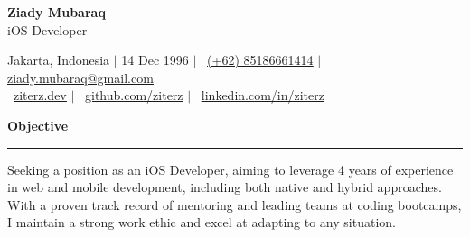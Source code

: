 \documentclass{article}
\newcommand{\header}[1]{
	\vspace{4mm}
	{\large \noindent \textbf{#1}}
	\vspace{1mm}
	\hrule
	\vspace{1mm}
}
\begin{document}
	\begin{flushleft}
		{\LARGE \textbf{Ziady Mubaraq}} \\
		{\large iOS Developer}

		\vspace{1mm}
		
		Jakarta, Indonesia  $\mid$ 14 Dec 1996 $\mid$ \faWhatsapp ~\href{https://wa.me/6285186661414}{\underline{(+62) 85186661414}} $\mid$ \faEnvelope[regular] \href{mailto:ziady.mubaraq@gmail.com}{\underline{ziady.mubaraq@gmail.com}} \\
		\faLink ~\href{https://ziterz.dev}{\underline{ziterz.dev}}  $\mid$ \faGithub ~\href{https://github.com/ziterz}{\underline{github.com/ziterz}} $\mid$ \faLinkedin ~\href{https://linkedin.com/in/ziterz}{\underline{linkedin.com/in/ziterz}}
	\end{flushleft}

	\vspace{-4mm}

	\header{Objective}
		\vspace{1mm}
		Seeking a position as an iOS Developer, aiming to leverage 4 years of experience in web and mobile development, including both native and hybrid approaches. With a proven track record of mentoring and leading teams at coding bootcamps, I maintain a strong work ethic and excel at adapting to any situation.

	\setlength{\columnsep}{1.5em}
\end{document}
